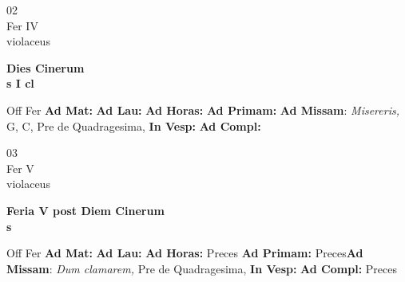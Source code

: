 \documentclass[10pt, openany]{book}
\begin{document}
        \begin{center}
            \begin{minipage}{3.5in}
                \vspace{2em}
                \begin{minipage}{0.5in}
                    {\Huge 02} \\
                    {\normalsize Fer IV} \\
                    {\normalsize violaceus}
                \end{minipage}
                \begin{minipage}{3.0in}
                    \textbf{ \large Dies Cinerum \\
                    \textnormal{\normalsize s I cl}} \\ 
                \end{minipage}
                \begin{justify}Off Fer
                    \textbf{Ad Mat: }
                    \textbf{Ad Lau: }
                    \textbf{Ad Horas: }
                    \textbf{Ad Primam: }\textbf{Ad Missam}: \textit{Misereris,} G, C, Pre de Quadragesima,  
                    \textbf{In Vesp: }
                    \textbf{Ad Compl: }
                \end{justify}
            \end{minipage}
        \end{center}
    
        \begin{center}
            \begin{minipage}{3.5in}
                \vspace{2em}
                \begin{minipage}{0.5in}
                    {\Huge 03} \\
                    {\normalsize Fer V} \\
                    {\normalsize violaceus}
                \end{minipage}
                \begin{minipage}{3.0in}
                    \textbf{ \large Feria V post Diem Cinerum \\
                    \textnormal{\normalsize s}} \\ 
                \end{minipage}
                \begin{justify}Off Fer
                    \textbf{Ad Mat: }
                    \textbf{Ad Lau: }
                    \textbf{Ad Horas: }Preces
                    \textbf{Ad Primam: }Preces\textbf{Ad Missam}: \textit{Dum clamarem,} Pre de Quadragesima,  
                    \textbf{In Vesp: }
                    \textbf{Ad Compl: }Preces
                \end{justify}
            \end{minipage}
        \end{center}
    
\end{document}
